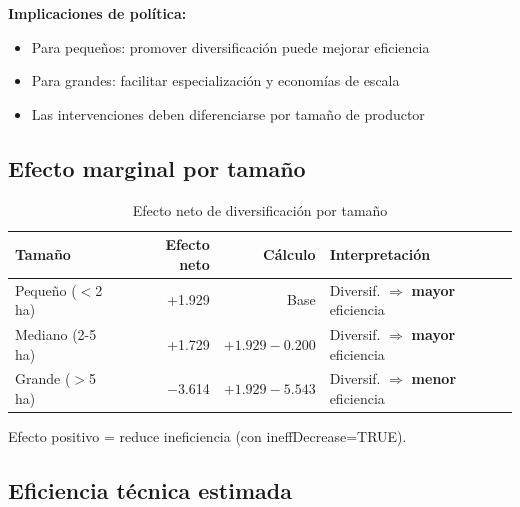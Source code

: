 \documentclass[11pt,a4paper]{article}
\begin{document}
\textbf{Implicaciones de política:}
\begin{itemize}
    \item Para pequeños: promover diversificación puede mejorar eficiencia
    \item Para grandes: facilitar especialización y economías de escala
    \item Las intervenciones deben diferenciarse por tamaño de productor
\end{itemize}

\subsection{Efecto marginal por tamaño}

\begin{table}[H]
\centering
\caption{Efecto neto de diversificación por tamaño}
\label{tab:marginal_diversif}
\begin{threeparttable}
\small
\begin{tabular}{lrrl}
\toprule
\textbf{Tamaño} & \textbf{Efecto neto} & \textbf{Cálculo} & \textbf{Interpretación} \\
\midrule
Pequeño ($<$2 ha) & +1.929 & Base & Diversif. $\Rightarrow$ \textbf{mayor} eficiencia \\
Mediano (2-5 ha) & +1.729 & $+1.929-0.200$ & Diversif. $\Rightarrow$ \textbf{mayor} eficiencia \\
Grande ($>$5 ha) & $-$3.614 & $+1.929-5.543$ & Diversif. $\Rightarrow$ \textbf{menor} eficiencia \\
\bottomrule
\end{tabular}
\begin{tablenotes}
\footnotesize
\item Efecto positivo = reduce ineficiencia (con ineffDecrease=TRUE).
\end{tablenotes}
\end{threeparttable}
\end{table}

\subsection{Eficiencia técnica estimada}
\end{document}
